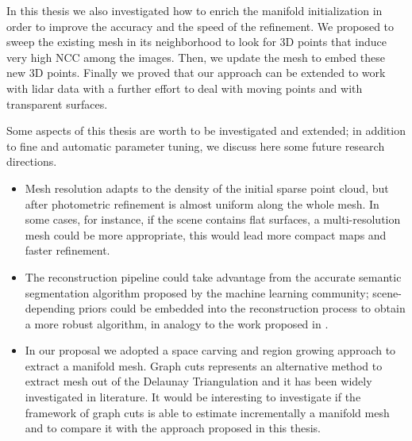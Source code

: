 In this thesis we also investigated how to enrich the manifold initialization in order to improve the accuracy and the speed of the refinement. 
We proposed to sweep the existing mesh in its neighborhood to look for 3D points that induce very high NCC among the images. Then, we  update the mesh to embed these new 3D points.
Finally we proved that our approach can be extended to work with lidar data with a further effort to deal with moving points and with transparent surfaces.

Some aspects of this thesis are worth to be investigated and extended; in addition to fine and automatic parameter tuning, we discuss here some future research directions.
\begin{itemize}
 \item Mesh resolution adapts to the density of the initial sparse point cloud, but after photometric refinement is almost uniform along the whole mesh. In some cases, for instance, if the scene contains flat surfaces, a multi-resolution mesh could be more appropriate, this would lead more compact maps and faster refinement.
 \item The reconstruction pipeline could take advantage from the accurate semantic segmentation algorithm proposed by the machine learning community; scene-depending priors could be embedded into the reconstruction process to obtain a more robust algorithm, in analogy to the work proposed in  \cite{savinov2016semantic,HaZa16}.
 \item In our proposal we adopted a space carving and region growing approach to extract a manifold mesh. Graph cuts represents an alternative method to extract mesh out of the Delaunay Triangulation and it has been widely investigated in literature. It would be interesting to investigate if the framework of graph cuts is able to estimate incrementally a manifold mesh and to compare it with the approach proposed in this thesis.
\end{itemize}




















